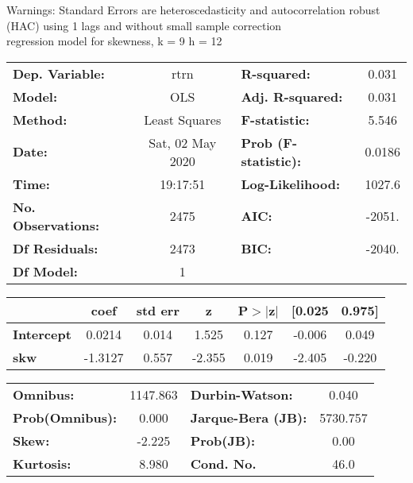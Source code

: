 Warnings: \newline
 [1] Standard Errors are heteroscedasticity and autocorrelation robust (HAC) using 1 lags and without small sample correction\\ 

regression model for skewness, k = 9 h = 12\begin{center}
\begin{tabular}{lclc}
\toprule
\textbf{Dep. Variable:}    &       rtrn       & \textbf{  R-squared:         } &     0.031   \\
\textbf{Model:}            &       OLS        & \textbf{  Adj. R-squared:    } &     0.031   \\
\textbf{Method:}           &  Least Squares   & \textbf{  F-statistic:       } &     5.546   \\
\textbf{Date:}             & Sat, 02 May 2020 & \textbf{  Prob (F-statistic):} &   0.0186    \\
\textbf{Time:}             &     19:17:51     & \textbf{  Log-Likelihood:    } &    1027.6   \\
\textbf{No. Observations:} &        2475      & \textbf{  AIC:               } &    -2051.   \\
\textbf{Df Residuals:}     &        2473      & \textbf{  BIC:               } &    -2040.   \\
\textbf{Df Model:}         &           1      & \textbf{                     } &             \\
\bottomrule
\end{tabular}
\begin{tabular}{lcccccc}
                   & \textbf{coef} & \textbf{std err} & \textbf{z} & \textbf{P$> |$z$|$} & \textbf{[0.025} & \textbf{0.975]}  \\
\midrule
\textbf{Intercept} &       0.0214  &        0.014     &     1.525  &         0.127        &       -0.006    &        0.049     \\
\textbf{skw}       &      -1.3127  &        0.557     &    -2.355  &         0.019        &       -2.405    &       -0.220     \\
\bottomrule
\end{tabular}
\begin{tabular}{lclc}
\textbf{Omnibus:}       & 1147.863 & \textbf{  Durbin-Watson:     } &    0.040  \\
\textbf{Prob(Omnibus):} &   0.000  & \textbf{  Jarque-Bera (JB):  } & 5730.757  \\
\textbf{Skew:}          &  -2.225  & \textbf{  Prob(JB):          } &     0.00  \\
\textbf{Kurtosis:}      &   8.980  & \textbf{  Cond. No.          } &     46.0  \\
\bottomrule
\end{tabular}
\end{center}

